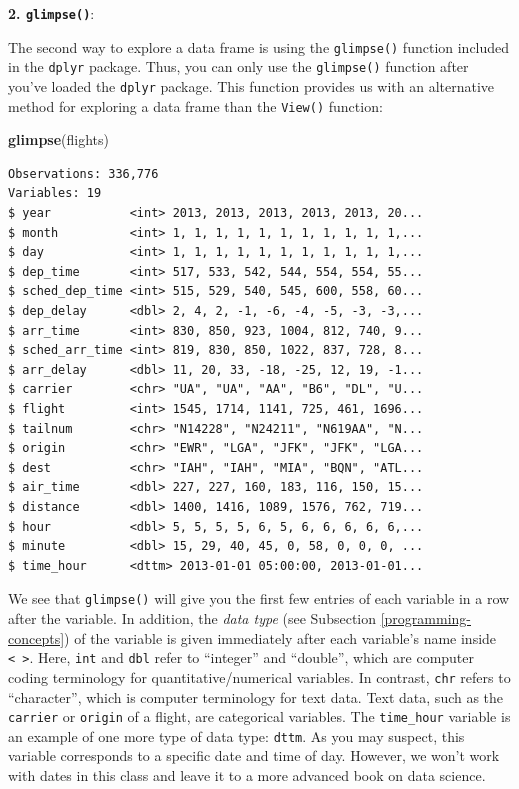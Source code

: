 \documentclass[12pt, krantz2,]{krantz}
\makeatletter
\newenvironment{Shaded}{\begin{snugshade}}{\end{snugshade}}
\newcommand{\KeywordTok}[1]{\textcolor[rgb]{0.27,0.27,0.27}{\textbf{#1}}}
\newcommand{\NormalTok}[1]{#1}
\newenvironment{kframe}{%
\medskip{}
\setlength{\fboxsep}{.8em}
 \def\at@end@of@kframe{}%
 \ifinner\ifhmode%
  \def\at@end@of@kframe{\end{minipage}}%
  \begin{minipage}{\columnwidth}%
 \fi\fi%
 \def\FrameCommand##1{\hskip\@totalleftmargin \hskip-\fboxsep
 \colorbox{shadecolor}{##1}\hskip-\fboxsep
     \hskip-\linewidth \hskip-\@totalleftmargin \hskip\columnwidth}%
 \MakeFramed {\advance\hsize-\width
   \@totalleftmargin\z@ \linewidth\hsize
   \@setminipage}}%
 {\par\unskip\endMakeFramed%
 \at@end@of@kframe}
\renewenvironment{Shaded}{\begin{kframe}}{\end{kframe}}
\makeatother
\begin{document}
\textbf{2. \texttt{glimpse()}}:

The second way to explore a data frame is using the \texttt{glimpse()} function included in the \texttt{dplyr} package. Thus, you can only use the \texttt{glimpse()} function after you've loaded the \texttt{dplyr} package. This function provides us with an alternative method for exploring a data frame than the \texttt{View()} function:

\begin{Shaded}
\begin{Highlighting}[]
\KeywordTok{glimpse}\NormalTok{(flights)}
\end{Highlighting}
\end{Shaded}

\begin{verbatim}
Observations: 336,776
Variables: 19
$ year           <int> 2013, 2013, 2013, 2013, 2013, 20...
$ month          <int> 1, 1, 1, 1, 1, 1, 1, 1, 1, 1, 1,...
$ day            <int> 1, 1, 1, 1, 1, 1, 1, 1, 1, 1, 1,...
$ dep_time       <int> 517, 533, 542, 544, 554, 554, 55...
$ sched_dep_time <int> 515, 529, 540, 545, 600, 558, 60...
$ dep_delay      <dbl> 2, 4, 2, -1, -6, -4, -5, -3, -3,...
$ arr_time       <int> 830, 850, 923, 1004, 812, 740, 9...
$ sched_arr_time <int> 819, 830, 850, 1022, 837, 728, 8...
$ arr_delay      <dbl> 11, 20, 33, -18, -25, 12, 19, -1...
$ carrier        <chr> "UA", "UA", "AA", "B6", "DL", "U...
$ flight         <int> 1545, 1714, 1141, 725, 461, 1696...
$ tailnum        <chr> "N14228", "N24211", "N619AA", "N...
$ origin         <chr> "EWR", "LGA", "JFK", "JFK", "LGA...
$ dest           <chr> "IAH", "IAH", "MIA", "BQN", "ATL...
$ air_time       <dbl> 227, 227, 160, 183, 116, 150, 15...
$ distance       <dbl> 1400, 1416, 1089, 1576, 762, 719...
$ hour           <dbl> 5, 5, 5, 5, 6, 5, 6, 6, 6, 6, 6,...
$ minute         <dbl> 15, 29, 40, 45, 0, 58, 0, 0, 0, ...
$ time_hour      <dttm> 2013-01-01 05:00:00, 2013-01-01...
\end{verbatim}

We see that \texttt{glimpse()} will give you the first few entries of each variable in a row after the variable. In addition, the \emph{data type} (see Subsection \ref{programming-concepts}) of the variable is given immediately after each variable's name inside \texttt{\textless{}\ \textgreater{}}. Here, \texttt{int} and \texttt{dbl} refer to ``integer'' and ``double'', which are computer coding terminology for quantitative/numerical variables. In contrast, \texttt{chr} refers to ``character'', which is computer terminology for text data. Text data, such as the \texttt{carrier} or \texttt{origin} of a flight, are categorical variables. The \texttt{time\_hour} variable is an example of one more type of data type: \texttt{dttm}. As you may suspect, this variable corresponds to a specific date and time of day. However, we won't work with dates in this class and leave it to a more advanced book on data science.
\end{document}
